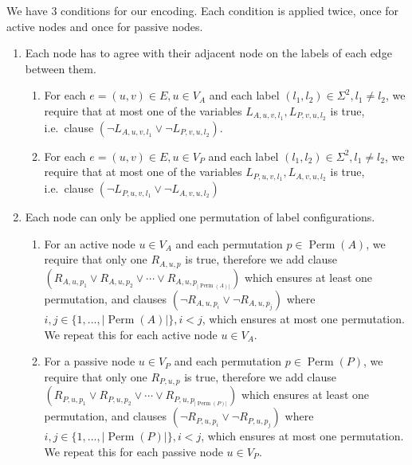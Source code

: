 \renewcommand{\labelenumi}{\arabic{enumi}.}
\renewcommand{\labelenumii}{\arabic{enumi}\alph{enumii}.}
We have 3 conditions for our encoding.
Each condition is applied twice, once for active nodes and once for passive nodes.
\begin{enumerate}
\item
  Each node has to agree with their adjacent node on the labels of each edge between them.
  \begin{enumerate}
  \item
    For each $e=(u, v)\in E, u\in V_A$ and each label $(l_1, l_2) \in \Sigma^2, l_1 \neq l_2$, we require that at most one of the variables $L_{A,u,v,l_1}, L_{P,v,u,l_2}$ is true, i.e.\ clause $(\neg L_{A,u,v,l_1} \lor \neg L_{P,v,u,l_2})$.
    \label{enu:sat_conditions:1a}
  \item
    For each $e=(u, v)\in E, u\in V_P$ and each label $(l_1, l_2) \in \Sigma^2, l_1 \neq l_2$, we require that at most one of the variables $L_{P,u,v,l_1}, L_{A,v,u,l_2}$ is true, i.e.\ clause $(\neg L_{P,u,v,l_1} \lor \neg L_{A,v,u,l_2})$
    \label{enu:sat_conditions:1b}
  \end{enumerate}
\item
  Each node can only be applied one permutation of label configurations.
  \begin{enumerate}
  \item
    For an active node $u \in V_A$ and each permutation $p \in \operatorname{Perm}(A)$, we require that only one $R_{A, u, p}$ is true, therefore we add clause $(R_{A, u, p_1} \lor R_{A, u, p_2} \lor \dotsm \lor R_{A, u, p_{|\operatorname{Perm}(A)|}})$ which ensures at least one permutation,
    and clauses
    $ (\neg R_{A, u, p_i} \lor \neg R_{A, u, p_j})$ where $i, j \in \{1, ..., |\operatorname{Perm}(A)|\}, i < j$,
    which ensures at most one permutation.
    We repeat this for each active node $u \in V_A$.
    \label{enu:sat_conditions:2a}
  \item
    For a passive node $u \in V_P$ and each permutation $p \in \operatorname{Perm}(P)$, we require that only one $R_{P, u, p}$ is true, therefore we add clause $(R_{P, u, p_1} \lor R_{P, u, p_2} \lor \dotsm \lor R_{P, u, p_{|\operatorname{Perm}(P)|}})$ which ensures at least one permutation,
    and clauses
    $ (\neg R_{P, u, p_i} \lor \neg R_{P, u, p_j})$ where $i, j \in \{1, ..., |\operatorname{Perm}(P)|\}, i < j$,
    which ensures at most one permutation.
    We repeat this for each passive node $u \in V_P$.
    \label{enu:sat_conditions:2b}
  \end{enumerate}

\end{enumerate}
